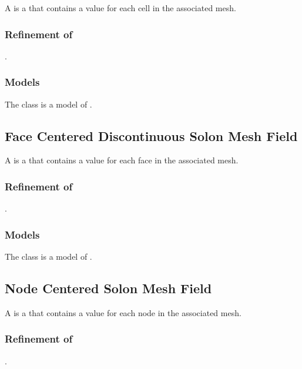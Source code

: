 \documentclass[11pt]{rnote}
\begin{document}
A  is a  that contains a value for each cell in the associated mesh.

\subsubsection{Refinement of}
.

\subsubsection{Models}

The  class is a model of .

\bigskip

\subsection{Face Centered Discontinuous Solon Mesh Field}

A  is a
 that contains a value for each face in the
associated mesh.

\subsubsection{Refinement of}
.

\subsubsection{Models}

The  class is a model of .

\bigskip

\subsection{Node Centered Solon Mesh Field}

A  is a  that contains a value for each node in the associated mesh.

\subsubsection{Refinement of}
.
\end{document}
